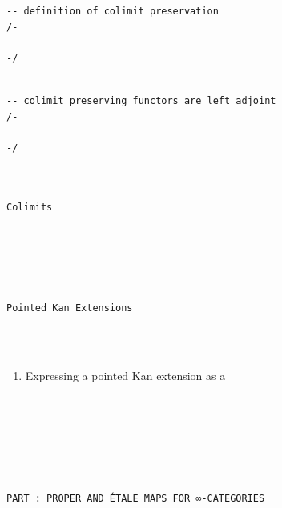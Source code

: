 \documentclass{book}
\theoremstyle{definition}
\newcounter{pcounter}
\newcounter{lcounter}
\renewcommand{\chapter}[1]{
\newpage
{
\Huge 
\begin{center}
\ \\
\ \\
\thispagestyle{empty}
\texttt{#1}
\end{center}}
\ \\
\ \\
}
\newcounter{partcount}
\renewcommand{\part}[1]{
\newpage
{
\Huge 
\begin{center}
\ \\
\ \\
\ \\
\ \\
\ \\
\ \\
\thispagestyle{empty}
\texttt{PART {\thepartcount}: #1}
\stepcounter{partcount}
\end{center}}
\ \\
\ \\
}
\begin{document}
{{\begin{center}
\begin{tcolorbox}[width=5in,colback={white},title={\begin{center}\texttt{Lean \thelcounter} \addtocounter{lcounter}{1}  \end{center}},colbacktitle=Blue,coltitle=black]
\begin{verbatim}
-- definition of colimit preservation
/-

-/

\end{verbatim}
\end{tcolorbox}
\end{center}

\begin{center}
\begin{tcolorbox}[width=5in,colback={white},title={\begin{center}\texttt{Lean \thelcounter} \addtocounter{lcounter}{1}  \end{center}},colbacktitle=Blue,coltitle=black]
\begin{verbatim}

-- colimit preserving functors are left adjoint
/-

-/

\end{verbatim}
\end{tcolorbox}
\end{center}

\chapter{Colimits}

\chapter{Pointed Kan Extensions}

\begin{enumerate}
\item Expressing a pointed Kan extension as a 
\end{enumerate}







\part{PROPER AND ÉTALE MAPS FOR ∞-CATEGORIES}

}}
\end{document}
